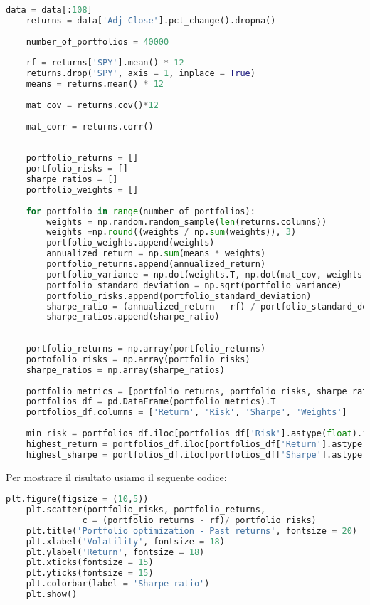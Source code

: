 \documentclass{report}
\begin{document}
\begin{lstlisting}[language=python]
    data = data[:108]
    returns = data['Adj Close'].pct_change().dropna()
    
    number_of_portfolios = 40000
    
    rf = returns['SPY'].mean() * 12
    returns.drop('SPY', axis = 1, inplace = True)
    means = returns.mean() * 12
    
    mat_cov = returns.cov()*12
    
    mat_corr = returns.corr()
    
    
    portfolio_returns = []
    portfolio_risks = []
    sharpe_ratios = []
    portfolio_weights = []
    
    for portfolio in range(number_of_portfolios):
        weights = np.random.random_sample(len(returns.columns))
        weights =np.round((weights / np.sum(weights)), 3)
        portfolio_weights.append(weights)
        annualized_return = np.sum(means * weights)
        portfolio_returns.append(annualized_return)
        portfolio_variance = np.dot(weights.T, np.dot(mat_cov, weights))
        portfolio_standard_deviation = np.sqrt(portfolio_variance)
        portfolio_risks.append(portfolio_standard_deviation)
        sharpe_ratio = (annualized_return - rf) / portfolio_standard_deviation
        sharpe_ratios.append(sharpe_ratio)
    
    
    portfolio_returns = np.array(portfolio_returns)
    portofolio_risks = np.array(portfolio_risks)
    sharpe_ratios = np.array(sharpe_ratios)
    
    portfolio_metrics = [portfolio_returns, portfolio_risks, sharpe_ratios, portfolio_weights]
    portfolios_df = pd.DataFrame(portfolio_metrics).T
    portfolios_df.columns = ['Return', 'Risk', 'Sharpe', 'Weights']
    
    min_risk = portfolios_df.iloc[portfolios_df['Risk'].astype(float).idxmin()]
    highest_return = portfolios_df.iloc[portfolios_df['Return'].astype(float).idxmax()]
    highest_sharpe = portfolios_df.iloc[portfolios_df['Sharpe'].astype(float).idxmax()]
\end{lstlisting}
Per mostrare il risultato usiamo il seguente codice:
\begin{lstlisting}[language=python]
    plt.figure(figsize = (10,5))
    plt.scatter(portfolio_risks, portfolio_returns, 
               c = (portfolio_returns - rf)/ portfolio_risks)
    plt.title('Portfolio optimization - Past returns', fontsize = 20)
    plt.xlabel('Volatility', fontsize = 18)
    plt.ylabel('Return', fontsize = 18)
    plt.xticks(fontsize = 15)
    plt.yticks(fontsize = 15)
    plt.colorbar(label = 'Sharpe ratio')
    plt.show()
\end{lstlisting}
\end{document}
